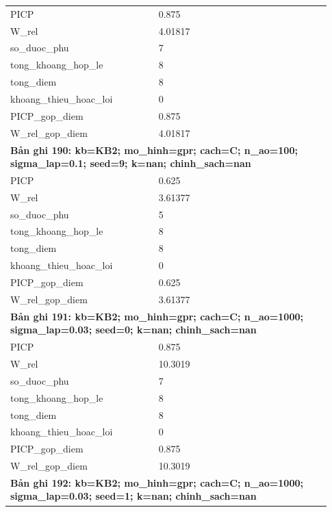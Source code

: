 \begin{longtable}{p{0.43\linewidth}p{0.50\linewidth}}
PICP & 0.875 \\
W\_\allowbreak rel & 4.01817 \\
so\_\allowbreak duoc\_\allowbreak phu & 7 \\
tong\_\allowbreak khoang\_\allowbreak hop\_\allowbreak le & 8 \\
tong\_\allowbreak diem & 8 \\
khoang\_\allowbreak thieu\_\allowbreak hoac\_\allowbreak loi & 0 \\
PICP\_\allowbreak gop\_\allowbreak diem & 0.875 \\
W\_\allowbreak rel\_\allowbreak gop\_\allowbreak diem & 4.01817 \\
\midrule
\multicolumn{2}{p{0.95\linewidth}}{\textbf{Bản ghi 190: kb=KB2; mo\_hinh=gpr; cach=C; n\_ao=100; sigma\_lap=0.1; seed=9; k=nan; chinh\_sach=nan}} \\
PICP & 0.625 \\
W\_\allowbreak rel & 3.61377 \\
so\_\allowbreak duoc\_\allowbreak phu & 5 \\
tong\_\allowbreak khoang\_\allowbreak hop\_\allowbreak le & 8 \\
tong\_\allowbreak diem & 8 \\
khoang\_\allowbreak thieu\_\allowbreak hoac\_\allowbreak loi & 0 \\
PICP\_\allowbreak gop\_\allowbreak diem & 0.625 \\
W\_\allowbreak rel\_\allowbreak gop\_\allowbreak diem & 3.61377 \\
\midrule
\multicolumn{2}{p{0.95\linewidth}}{\textbf{Bản ghi 191: kb=KB2; mo\_hinh=gpr; cach=C; n\_ao=1000; sigma\_lap=0.03; seed=0; k=nan; chinh\_sach=nan}} \\
PICP & 0.875 \\
W\_\allowbreak rel & 10.3019 \\
so\_\allowbreak duoc\_\allowbreak phu & 7 \\
tong\_\allowbreak khoang\_\allowbreak hop\_\allowbreak le & 8 \\
tong\_\allowbreak diem & 8 \\
khoang\_\allowbreak thieu\_\allowbreak hoac\_\allowbreak loi & 0 \\
PICP\_\allowbreak gop\_\allowbreak diem & 0.875 \\
W\_\allowbreak rel\_\allowbreak gop\_\allowbreak diem & 10.3019 \\
\midrule
\multicolumn{2}{p{0.95\linewidth}}{\textbf{Bản ghi 192: kb=KB2; mo\_hinh=gpr; cach=C; n\_ao=1000; sigma\_lap=0.03; seed=1; k=nan; chinh\_sach=nan}} \\

\end{longtable}
